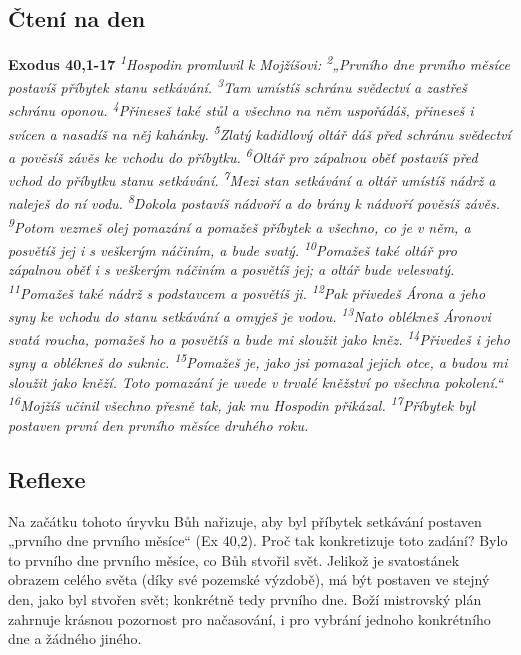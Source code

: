 \documentclass[11pt]{article}
\begin{document}
\subsection*{Čtení na den}
\textbf{Exodus 40,1-17}
\newline
\textit{
\textsuperscript{1}Hospodin promluvil k Mojžíšovi:
\textsuperscript{2}„Prvního dne prvního měsíce postavíš příbytek stanu setkávání.
\textsuperscript{3}Tam umístíš schránu svědectví a zastřeš schránu oponou.
\textsuperscript{4}Přineseš také stůl a všechno na něm uspořádáš, přineseš i svícen a nasadíš na něj kahánky.
\textsuperscript{5}Zlatý kadidlový oltář dáš před schránu svědectví a pověsíš závěs ke vchodu do příbytku.
\textsuperscript{6}Oltář pro zápalnou oběť postavíš před vchod do příbytku stanu setkávání.
\textsuperscript{7}Mezi stan setkávání a oltář umístíš nádrž a naleješ do ní vodu.
\textsuperscript{8}Dokola postavíš nádvoří a do brány k nádvoří pověsíš závěs.
\textsuperscript{9}Potom vezmeš olej pomazání a pomažeš příbytek a všechno, co je v něm, a posvětíš jej i s veškerým náčiním, a bude svatý.
\textsuperscript{10}Pomažeš také oltář pro zápalnou oběť i s veškerým náčiním a posvětíš jej; a oltář bude velesvatý.
\textsuperscript{11}Pomažeš také nádrž s podstavcem a posvětíš ji.
\textsuperscript{12}Pak přivedeš Árona a jeho syny ke vchodu do stanu setkávání a omyješ je vodou.
\textsuperscript{13}Nato oblékneš Áronovi svatá roucha, pomažeš ho a posvětíš a bude mi sloužit jako kněz.
\textsuperscript{14}Přivedeš i jeho syny a oblékneš do suknic.
\textsuperscript{15}Pomažeš je, jako jsi pomazal jejich otce, a budou mi sloužit jako kněží. Toto pomazání je uvede v trvalé kněžství po všechna pokolení.“
\textsuperscript{16}Mojžíš učinil všechno přesně tak, jak mu Hospodin přikázal.
\textsuperscript{17}Příbytek byl postaven první den prvního měsíce druhého roku.
}

\subsection*{Reflexe}
Na začátku tohoto úryvku Bůh nařizuje, aby byl příbytek setkávání postaven „prvního dne prvního měsíce“ (Ex 40,2). Proč tak
konkretizuje toto zadání? Bylo to prvního dne prvního měsíce, co Bůh stvořil svět. Jelikož je svatostánek obrazem celého světa
(díky své pozemské výzdobě), má být postaven ve stejný den, jako byl stvořen svět; konkrétně tedy prvního dne. Boží mistrovský
plán zahrnuje krásnou pozornost pro načasování, i pro vybrání jednoho konkrétního dne a žádného jiného.
\end{document}
